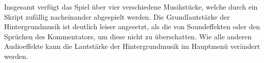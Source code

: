 Insgesamt verfügt das Spiel über vier verschiedene Musikstücke, welche durch ein Skript zufällig nacheinander abgespielt werden. Die Grundlautstärke der Hintergrundmusik ist deutlich leiser angesetzt, als die von Soundeffekten oder den Sprüchen des Kommentators, um diese nicht zu überschatten. Wie alle anderen Audioeffekte kann die Lautstärke der Hintergrundmusik im Hauptmenü verändert werden. 
